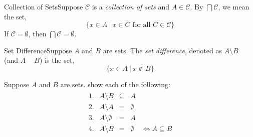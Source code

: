 \renewcommand{\theenumi}{\arabic{enumi}}
\renewcommand{\labelenumi}{\theenumi.}
    
    \begin{definition}
        {Collection of Sets}Suppose \(\mathcal{C}\) is a \textit{collection of sets} and \(A\in \mathcal{C}\). By $
        \bigcap \mathcal{C}$, we mean the set, \[\{x\in A \ | \ x\in C \text{ for all } C\in \mathcal{C}\}\]
        If \(\mathcal{C} = \emptyset\), then \(\bigcap \mathcal{C} = \emptyset\).
    \end{definition}   

    \begin{definition}
        {Set Difference}Suppose \(A\) and \(B\) are sets. The \textit{set difference}, denoted as \(A \setminus B\) \\ (and \(A-B\)) is the set, \[\{x\in A \ | \ x \notin B\}\]
    \end{definition}




    \begin{exercise}
        {}Suppose \(A\) and \(B\) are sets. show each of the following: 
        \begin{align*}
            \begin{array}{ccccl}
                1. & A \setminus B & \subseteq & A \\
                2. & A \setminus A & = & \emptyset \\
                3. & A \setminus \emptyset & = & A \\
                4. & A \setminus B & = & \emptyset & \iff A \subseteq B \\
            \end{array}
        \end{align*}

    \end{exercise}
    

